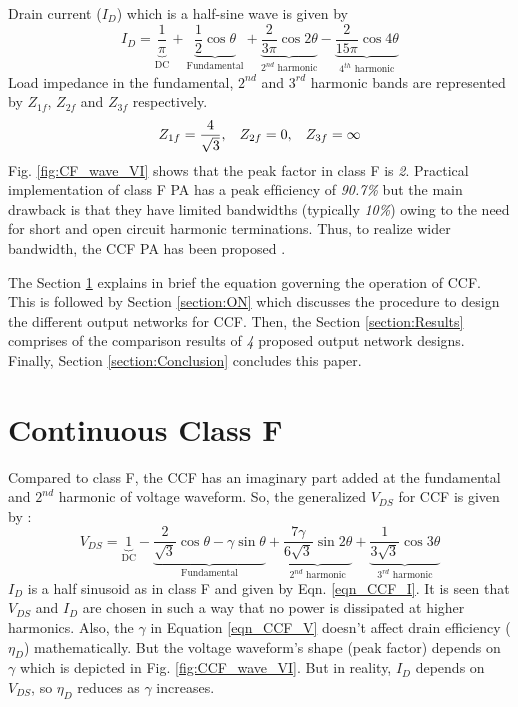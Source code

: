 \documentclass[conference]{IEEEtran}
\begin{document}
Drain current ($I_{D}$) which is a half-sine wave is given by
\begin{equation}
I_{D}=\underbrace{\frac{1}{\pi}}_{\text{DC}}+\underbrace{\frac{1}{2} \cos \theta}_{\text{Fundamental}}+\underbrace{\frac{2}{3 \pi} \cos 2 \theta}_{\text{$2^{nd}$ harmonic}}-\underbrace{\frac{2}{15 \pi} \cos 4 \theta}_{\text{$4^{th}$ harmonic}}
\label{eqn_CCF_I}
\end{equation}
Load impedance in the fundamental, $2^{nd}$ and $3^{rd}$  harmonic bands are represented by $Z_{1f}$, $Z_{2f}$ and $Z_{3f}$ respectively.
\begin{equation}
\begin{aligned}
Z_{1f}=\frac{4}{\sqrt{3}}, \hspace{3mm}
Z_{2f}=0, \hspace{3mm}
Z_{3f}=\infty
\end{aligned}
\label{eqn_CF}
\end{equation}
Fig. \ref{fig:CF_wave_VI} shows that the peak factor in class F is \textit{2}. Practical implementation of class F PA has a peak efﬁciency of \textit{90.7\%} but the main drawback is that they have limited bandwidths (typically \textit{10\%}) owing to the need for short and open circuit harmonic terminations. Thus, to realize wider bandwidth, the CCF PA has been proposed \cite{CCF_reason}.

The Section \ref{section:CCF} explains in brief the equation governing the operation of CCF. This is followed by Section \ref{section:ON} which discusses the procedure to design the different output networks for CCF. Then, the Section \ref{section:Results} comprises of the comparison results of \textit{4} proposed output network designs. Finally, Section \ref{section:Conclusion} concludes this paper.   

\section{Continuous Class F}
\label{section:CCF}
\vspace{-0.05in}
Compared to class F, the CCF has an imaginary part added at the fundamental and $2^{nd}$ harmonic of voltage waveform. So, the generalized $V_{DS}$ for CCF is given by \cite{ECCF_Carrubba}:
\begin{equation}
V_{DS}=\underbrace{1}_{\text{DC}}-\underbrace{\frac{2}{\sqrt{3}} \cos \theta-\gamma \sin \theta}_{\text{Fundamental}}+\underbrace{\frac{7 \gamma}{6 \sqrt{3}} \sin 2 \theta}_{\text{$2^{nd}$ harmonic}}+\underbrace{\frac{1}{3 \sqrt{3}} \cos 3 \theta}_{\text{$3^{rd}$ harmonic}}
\label{eqn_CCF_V}
\end{equation}
$I_{D}$ is a half sinusoid as in class F and given by Eqn. \ref{eqn_CCF_I}. It is seen that $V_{DS}$ and $I_{D}$ are chosen in such a way that no power is dissipated at higher harmonics. Also, the $\gamma$ in Equation \ref{eqn_CCF_V} doesn’t affect drain efficiency ($\eta_D$) mathematically. But the voltage waveform’s shape (peak factor) depends on $\gamma$ which is depicted in Fig. \ref{fig:CCF_wave_VI}. 
But in reality, $I_{D}$ depends on $V_{DS}$, so $\eta_D$ reduces as $\gamma$ increases.
\end{document}
